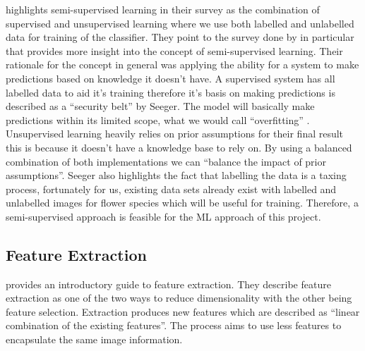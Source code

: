 \documentclass[12pt,a4paper]{report}
\begin{document}
\citet{zhu2005semi} highlights semi-supervised learning in their survey as the combination of supervised and
unsupervised 
learning where we use both labelled and unlabelled data for training of the classifier. They point to the survey done by
\citet{seeger2000learning} in particular that provides more insight into the concept of semi-supervised 
learning. Their rationale for the concept in general was applying the ability for a system to make predictions based on 
knowledge it doesn't have. A supervised system has all labelled data to aid it's training therefore it's basis on making
predictions is described as a “security belt” by Seeger. The model will basically make predictions within its limited 
scope, what we would call “overfitting” \citep{tom1995}. Unsupervised learning heavily relies on prior assumptions for 
their final result this is because it doesn't have a knowledge base to rely on. By using a balanced combination of both 
implementations we can “balance the impact of prior assumptions”. Seeger also highlights the fact that labelling the 
data is a taxing process, fortunately for us, existing data sets already exist with labelled and unlabelled images for 
flower species which will be useful for training. Therefore, a semi-supervised approach is feasible for the ML approach
of this project.

\subsection{Feature Extraction}

\citet{dishaa2021} provides an introductory guide to feature extraction. They describe feature extraction 
as one of the two ways to reduce dimensionality with the other being feature selection. Extraction produces new 
features which are described as “linear combination of the existing features”. The process aims to use less features to 
encapsulate the same image information.

\par
\end{document}
